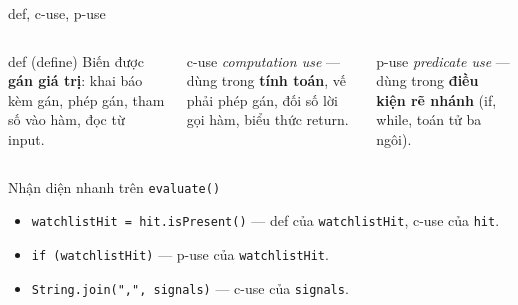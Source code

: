 \documentclass[aspectratio=169,12pt]{beamer}
\begin{document}
\begin{frame}{def, c-use, p-use}
  \begin{columns}[T]
    \begin{block}{def (define)}
      Biến được \textbf{gán giá trị}: khai báo kèm gán, phép gán,
      tham số vào hàm, đọc từ input.
    \end{block}

    \begin{block}{c-use}
      \textit{computation use} --- dùng trong \textbf{tính toán},
      vế phải phép gán, đối số lời gọi hàm, biểu thức return.
    \end{block}

    \begin{block}{p-use}
      \textit{predicate use} --- dùng trong \textbf{điều kiện
      rẽ nhánh} (if, while, toán tử ba ngôi).
    \end{block}
  \end{columns}

  \vspace{0.4em}
  \begin{exampleblock}{Nhận diện nhanh trên \texttt{evaluate()}}
    \begin{itemize}
      \item \texttt{watchlistHit = hit.isPresent()} --- def của
            \texttt{watchlistHit}, c-use của \texttt{hit}.
      \item \texttt{if (watchlistHit)} --- p-use của \texttt{watchlistHit}.
      \item \texttt{String.join(",", signals)} --- c-use của \texttt{signals}.
    \end{itemize}
  \end{exampleblock}
\end{frame}
\end{document}
